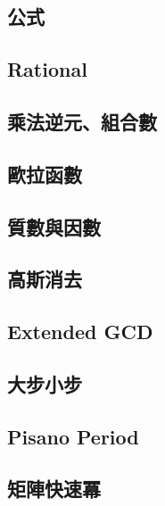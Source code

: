     \subsection{公式}
        
    \subsection{Rational}
        
    \subsection{乘法逆元、組合數}
        
    \subsection{歐拉函數}
         \columnbreak
    \subsection{質數與因數}
        
    \subsection{高斯消去}
        
    \subsection{Extended GCD}
         \columnbreak
    \subsection{大步小步}
         \columnbreak
    \subsection{Pisano Period}
        
    \subsection{矩陣快速冪}
         
\clearpage

